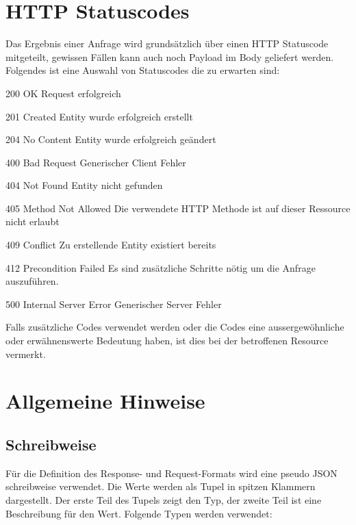 \documentclass[10pt,a4paper]{scrartcl}
\begin{document}
\pagebreak


\section{HTTP Statuscodes}
Das Ergebnis einer Anfrage wird grundsätzlich über einen HTTP Statuscode
mitgeteilt, gewissen Fällen kann auch noch Payload im Body geliefert werden.
Folgendes ist eine Auswahl von Statuscodes die zu erwarten sind:

\begin{description*}
	\item[200 OK] Request erfolgreich
	\item[201 Created] Entity wurde erfolgreich erstellt
	\item[204 No Content] Entity wurde erfolgreich geändert
	\item[400 Bad Request] Generischer Client Fehler
	\item[404 Not Found] Entity nicht gefunden
	\item[405 Method Not Allowed] Die verwendete HTTP Methode ist auf dieser
	Ressource nicht erlaubt
	\item[409 Conflict] Zu erstellende Entity existiert bereits
	\item[412 Precondition Failed] Es sind zusätzliche Schritte nötig um die
	Anfrage auszuführen.
	\item[500 Internal Server Error] Generischer Server Fehler
\end{description*}

Falls zusätzliche Codes verwendet werden oder die Codes eine aussergewöhnliche oder
erwähnenswerte Bedeutung haben, ist dies bei der betroffenen Resource vermerkt.


\pagebreak


\section{Allgemeine Hinweise}

\subsection{Schreibweise}
Für die Definition des Response- und Request-Formats wird eine pseudo JSON
schreibweise verwendet. Die Werte werden als Tupel in spitzen Klammern
dargestellt. Der erste Teil des Tupels zeigt den Typ, der zweite Teil ist eine
Beschreibung für den Wert. Folgende Typen werden verwendet:
\end{document}
